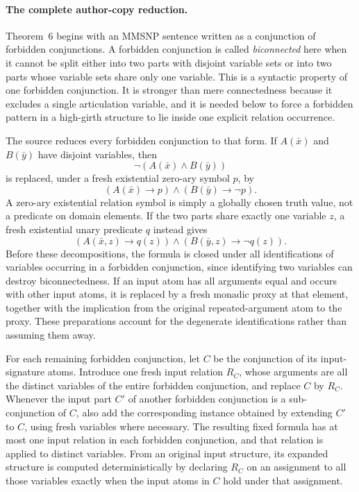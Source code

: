 \paragraph{The complete author-copy reduction.}
Theorem~6 begins with an MMSNP sentence written as a conjunction of forbidden
conjunctions.  A forbidden conjunction is called \emph{biconnected} here
when it cannot be split either into two parts with disjoint variable sets or
into two parts whose variable sets share only one variable.  This is a
syntactic property of one forbidden conjunction.  It is stronger than mere
connectedness because it excludes a single articulation variable, and it is
needed below to force a forbidden pattern in a high-girth structure to lie
inside one explicit relation occurrence.

The source reduces every forbidden conjunction to that form.  If
\(A(\bar x)\) and \(B(\bar y)\) have disjoint variables, then
\[
 \neg(A(\bar x)\land B(\bar y))
\]
is replaced, under a fresh existential zero-ary symbol \(p\), by
\[
 (A(\bar x)\to p)\land(B(\bar y)\to\neg p).
\]
A zero-ary existential relation symbol is simply a globally chosen truth
value, not a predicate on domain elements.  If the two parts share exactly
one variable \(z\), a fresh existential unary predicate \(q\) instead
gives
\[
 (A(\bar x,z)\to q(z))
 \land(B(\bar y,z)\to\neg q(z)).
\]
Before these decompositions, the formula is closed under all identifications
of variables occurring in a forbidden conjunction, since identifying two
variables can destroy biconnectedness.  If an input atom has all arguments
equal and occurs with other input atoms, it is replaced by a fresh monadic
proxy at that element, together with the implication from the original
repeated-argument atom to the proxy.  These preparations account for the
degenerate identifications rather than assuming them away.

For each remaining forbidden conjunction, let \(C\) be the conjunction of
its input-signature atoms.  Introduce one fresh input relation \(R_C\), whose
arguments are all the distinct variables of the entire forbidden conjunction,
and replace \(C\) by \(R_C\).  Whenever the input part \(C'\) of another forbidden
conjunction is a sub-conjunction of \(C\), also add the corresponding
instance obtained by extending \(C'\) to \(C\), using fresh variables
where necessary.  The resulting fixed formula has at most one input relation
in each forbidden conjunction, and that relation is applied to distinct
variables.  From an original input structure, its expanded structure is
computed deterministically by declaring \(R_C\) on an assignment to all those
variables exactly when the input atoms in \(C\) hold under that assignment.

